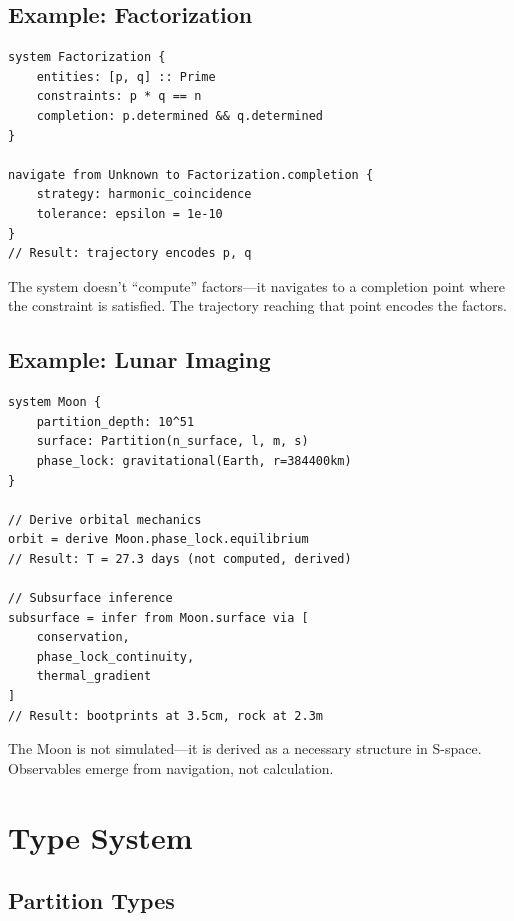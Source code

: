 \documentclass[twocolumn,10pt]{article}
\theoremstyle{remark}
\begin{document}
\subsection{Example: Factorization}

\begin{lstlisting}
system Factorization {
    entities: [p, q] :: Prime
    constraints: p * q == n
    completion: p.determined && q.determined
}

navigate from Unknown to Factorization.completion {
    strategy: harmonic_coincidence
    tolerance: epsilon = 1e-10
}
// Result: trajectory encodes p, q
\end{lstlisting}

The system doesn't ``compute'' factors---it navigates to a completion point where the constraint is satisfied. The trajectory reaching that point encodes the factors.

\subsection{Example: Lunar Imaging}

\begin{lstlisting}
system Moon {
    partition_depth: 10^51
    surface: Partition(n_surface, l, m, s)
    phase_lock: gravitational(Earth, r=384400km)
}

// Derive orbital mechanics
orbit = derive Moon.phase_lock.equilibrium
// Result: T = 27.3 days (not computed, derived)

// Subsurface inference
subsurface = infer from Moon.surface via [
    conservation,
    phase_lock_continuity,
    thermal_gradient
]
// Result: bootprints at 3.5cm, rock at 2.3m
\end{lstlisting}

The Moon is not simulated---it is derived as a necessary structure in S-space. Observables emerge from navigation, not calculation.

\section{Type System}
\label{sec:types}

\subsection{Partition Types}
\end{document}
